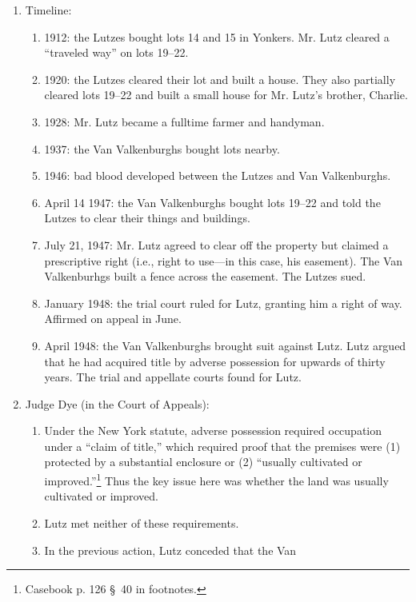 \begin{enumerate}
    \item Timeline:
    \begin{enumerate}
        \item 1912: the Lutzes bought lots 14 and 15 in Yonkers. Mr. Lutz 
        cleared a ``traveled way'' on lots 19--22.
        \item 1920: the Lutzes cleared their lot and built a house. They also 
        partially cleared lots 19--22 and built a small house for Mr. Lutz's 
        brother, Charlie.
        \item 1928: Mr. Lutz became a fulltime farmer and handyman.
        \item 1937: the Van Valkenburghs bought lots nearby.
        \item 1946: bad blood developed between the Lutzes and Van 
        Valkenburghs.
        \item April 14 1947: the Van Valkenburghs bought lots 19--22 and told the 
        Lutzes to clear their things and buildings.
        \item July 21, 1947: Mr. Lutz agreed to clear off the property but 
        claimed a prescriptive right (i.e., right to use---in this case, his 
        easement). The Van Valkenburhgs built a fence across the easement. The 
        Lutzes sued.
        \item January 1948: the trial court ruled for Lutz, granting him a 
        right of way. Affirmed on appeal in June.
        \item April 1948: the Van Valkenburghs brought suit against Lutz. Lutz 
        argued that he had acquired title by adverse possession for upwards of 
        thirty years. The trial and appellate courts found for Lutz.
    \end{enumerate}
    \item Judge Dye (in the Court of Appeals):
    \begin{enumerate}
        \item Under the New York statute, adverse possession required occupation under a ``claim of 
        title,'' which required proof that the premises were (1) protected by a 
        substantial enclosure or (2) ``usually cultivated or 
        improved.''\footnote{Casebook p. 126 \S\ 40 in footnotes.} Thus the 
        key issue here was whether the land was usually cultivated or 
        improved.
        \item Lutz met neither of these requirements.
        \item In the previous action, Lutz conceded that the Van 

\end{enumerate}
\end{enumerate}
